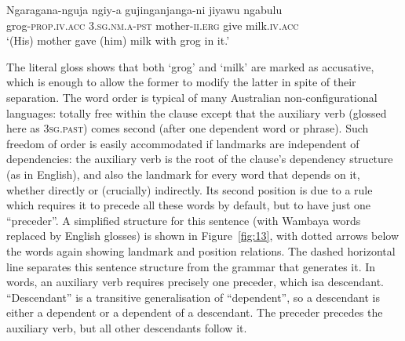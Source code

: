 \documentclass[output=paper
	        ,collection
	        ,collectionchapter
 	        ,biblatex
                ,babelshorthands
                ,newtxmath
                ,draftmode
                ,colorlinks, citecolor=brown
]{./langsci/langscibook}
\begin{document}
\begin{exe}
	\ex \label{ex:19}
	\gll Ngaragana-nguja ngiy-a gujinganjanga-ni jiyawu ngabulu\\
	grog\textsc{-prop}.\textsc{iv}.\textsc{acc} 3.\textsc{sg}.\textsc{nm}.\textsc{a}-\textsc{pst} mother-\textsc{ii}.\textsc{erg} give milk.\textsc{iv}.\textsc{acc}\\
	\glt ‘(His) mother gave (him) milk with grog in it.’
\end{exe}

The literal gloss shows that both ‘grog’ and ‘milk’ are marked as accusative, which is enough to allow the former to modify the latter in spite of their separation. The word order is typical of many Australian non-configurational languages: totally free within the clause except that the auxiliary verb (glossed here as \textsc{3sg.past}) comes second (after one dependent word or phrase). Such freedom of order is easily accommodated if landmarks are independent of dependencies: the auxiliary verb is the root of the clause’s dependency structure (as in English), and also the landmark for every word that depends on it, whether directly or (crucially) indirectly. Its second position is due to a rule which requires it to precede all these words by default, but to have just one ``preceder''. A simplified structure for this sentence (with Wambaya words replaced by English glosses) is shown in Figure~\ref{fig:13}, with dotted arrows below the words again showing landmark and position relations. The dashed horizontal line separates this sentence structure from the grammar that generates it. In words, an auxiliary verb requires precisely one preceder, which isa descendant. ``Descendant'' is a transitive generalisation of ``dependent'', so a descendant is either a dependent or a dependent of a descendant. The preceder precedes the auxiliary verb, but all other descendants follow it.
\end{document}
